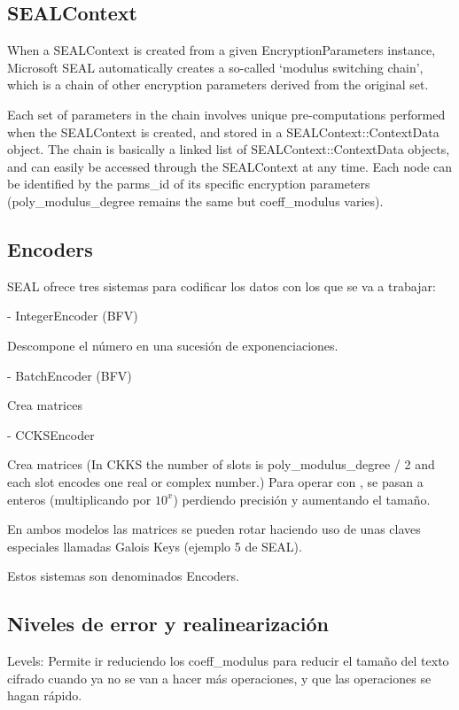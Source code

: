\subsection{SEALContext}

When a SEALContext is created from a given EncryptionParameters instance,
Microsoft SEAL automatically creates a so-called `modulus switching chain',
which is a chain of other encryption parameters derived from the original set.

Each set of parameters in the chain involves unique pre-computations performed
when the SEALContext is created, and stored in a SEALContext::ContextData
object. The chain is basically a linked list of SEALContext::ContextData
objects, and can easily be accessed through the SEALContext at any time. Each
node can be identified by the parms_id of its specific encryption parameters
(poly_modulus_degree remains the same but coeff_modulus varies).

\subsection{Encoders}

SEAL ofrece tres sistemas para codificar los datos con los que se va a trabajar:

    - IntegerEncoder (BFV)

    Descompone el número en una sucesión de exponenciaciones.

    - BatchEncoder (BFV)

    Crea matrices

    - CCKSEncoder

    Crea matrices (In CKKS the number of slots is poly\_modulus\_degree / 2 and each slot encodes one real or complex number.) Para operar con , se pasan a enteros (multiplicando por $10^x$) perdiendo precisión y aumentando el tamaño.


    En ambos modelos las matrices se pueden rotar haciendo uso de unas claves especiales llamadas Galois Keys (ejemplo 5 de SEAL).

Estos sistemas son denominados Encoders.

\subsection{Niveles de error y realinearización}


Levels: Permite ir reduciendo los coeff\_modulus para reducir el tamaño del texto cifrado cuando ya no se van a hacer más operaciones, y que las operaciones se hagan rápido.

